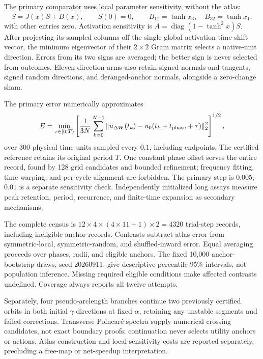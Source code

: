 The primary comparator uses local parameter sensitivity, without the atlas:
\begin{equation}
 \dot S=J(x)S+B(x),\qquad S(0)=0,
 \qquad B_{11}=\tanh x_3,\quad B_{32}=\tanh x_1,
\end{equation}
with other entries zero. Activation sensitivity is $A=\operatorname{diag}(1-\tanh^2x)S$. After projecting its sampled columns off the single global activation time-shift vector, the minimum eigenvector of their $2\times2$ Gram matrix selects a native-unit direction. Errors from its two signs are averaged; the better sign is never selected from outcomes. Eleven direction arms also retain signed normals and tangents, signed random directions, and deranged-anchor normals, alongside a zero-change sham.

The primary error numerically approximates
\begin{equation}
 E=\min_{\tau\in[0,T)}\left[
 \frac{1}{3N}\sum_{k=0}^{N-1}
 \|u_{\Delta W}(t_k)-u_0(t_k+t_{\rm phase}+\tau)\|_2^2
 \right]^{1/2},
\end{equation}
over 300 physical time units sampled every $0.1$, including endpoints. The certified reference retains its original period $T$. One constant phase offset serves the entire record, found by 128 grid candidates and bounded refinement; frequency fitting, time warping, and per-cycle alignment are forbidden. The primary step is $0.005$; $0.01$ is a separate sensitivity check. Independently initialized long assays measure peak retention, period, recurrence, and finite-time expansion as secondary mechanisms.

The complete census is $12\times4\times(4\times11+1)\times2=4320$ trial-step records, including ineligible-anchor records. Contrasts subtract atlas error from symmetric-local, symmetric-random, and shuffled-inward error. Equal averaging proceeds over phases, radii, and eligible anchors. The fixed 10,000 anchor-bootstrap draws, seed 20260911, give descriptive percentile 95\% intervals, not population inference. Missing required eligible conditions make affected contrasts undefined. Coverage always reports all twelve attempts.

Separately, four pseudo-arclength branches continue two previously certified orbits in both initial $\gamma$ directions at fixed $\alpha$, retaining any unstable segments and failed corrections. Transverse Poincar\'e spectra supply numerical crossing candidates, not exact boundary proofs; continuation never selects utility anchors or actions. Atlas construction and local-sensitivity costs are reported separately, precluding a free-map or net-speedup interpretation.

